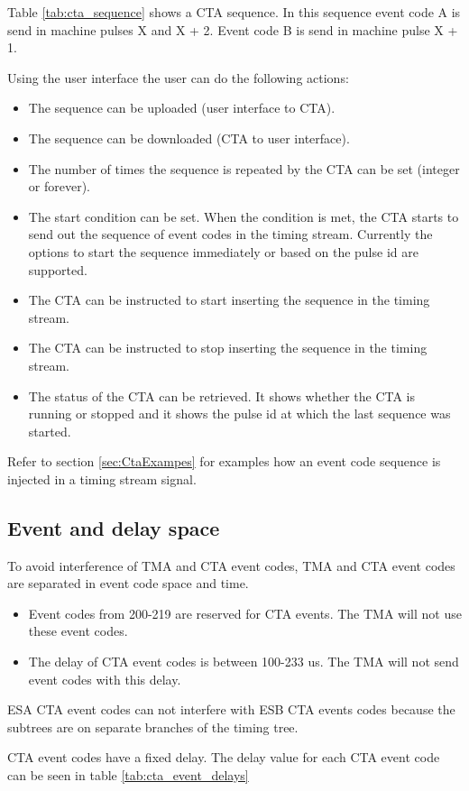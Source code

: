 \documentclass[12pt,a4paper]{article}
\begin{document}
Table \ref{tab:cta_sequence} shows a CTA sequence. In this sequence event code A is
send in machine pulses X and X + 2. Event code B is send in machine pulse X + 1.

Using the user interface the user can do the following actions:
\begin{itemize}
\item
The sequence can be uploaded (user interface to CTA).
\item
The sequence can be downloaded (CTA to user interface).
\item
The number of times the sequence is repeated by the CTA can be set (integer or
forever).
\item
The start condition can be set. When the condition is met, the CTA starts to
send out the sequence of event codes in the timing stream. Currently the
options to start the sequence immediately or based on the pulse id are
supported.
\item
The CTA can be instructed to start inserting the sequence in the timing stream.
\item
The CTA can be instructed to stop inserting the sequence in the timing stream.
\item
The status of the CTA can be retrieved. It shows whether the CTA is running
or stopped and it shows the pulse id at which the last sequence was started.
\end{itemize}

Refer to section \ref{sec:CtaExampes} for examples how an event code sequence
is injected in a timing stream signal.

\subsection{Event and delay space}
To avoid interference of TMA and CTA event codes, TMA and CTA event codes
are separated in event code space and time.

\begin{itemize}
\item
Event codes from 200-219 are reserved for CTA events. The TMA will not
use these event codes.
\item
The delay of CTA event codes is between 100-233 us. The TMA will not send event
codes with this delay.
\end{itemize}
ESA CTA event codes can not interfere with ESB CTA events codes because the
subtrees are on separate branches of the timing tree.

CTA event codes have a fixed delay. The delay value for each CTA event code
can be seen in table \ref{tab:cta_event_delays}
\end{document}
